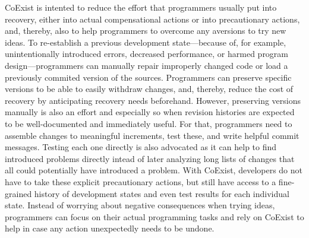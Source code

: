CoExist is intented to reduce the effort that programmers usually put into recovery, either into actual compensational actions or into precautionary actions, and, thereby, also to help programmers to overcome any aversions to try new ideas.
To re-establish a previous development state---because of, for example, unintentionally introduced errors, decreased performance, or harmed program design---programmers can manually repair improperly changed code or load a previously commited version of the sources.
Programmers can preserve specific versions to be able to easily withdraw changes, and, thereby, reduce the cost of recovery by anticipating recovery needs beforehand.
However, preserving versions manually is also an effort and especially so when revision histories are expected to be well-documented and immediately useful.
For that, programmers need to assemble changes to meaningful increments, test these, and write helpful commit messages.
Testing each one directly is also advocated as it can help to find introduced problems directly intead of later analyzing long lists of changes that all could potentially have introduced a problem.
With CoExist, developers do not have to take these explicit precautionary actions, but still have access to a fine-grained history of development states and even test results for each individual state.
Instead of worrying about negative consequences when trying ideas, programmers can focus on their actual programming tasks and rely on CoExist to help in case any action unexpectedly needs to be undone.



